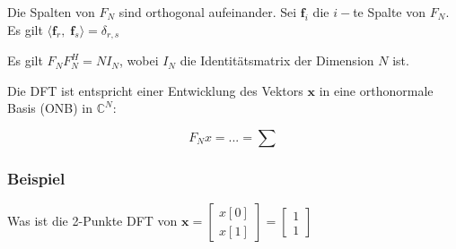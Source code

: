 \documentclass[11pt]{article}
\begin{document}

Die Spalten von $F_N$ sind orthogonal aufeinander. Sei $\mathbf{f}_i$ die $i-$te Spalte von $F_N$. Es gilt $\langle \mathbf{f}_r, \; \mathbf{f}_s \rangle = \delta_{r,s}$

Es gilt $F_N F_N^H = N I_N$, wobei $I_N$ die Identitätsmatrix der Dimension $N$ ist.

Die DFT ist entspricht einer Entwicklung des Vektors $\mathbf{x}$ in eine orthonormale Basis (ONB) in $\mathbb{C}^N$:

$$F_N x = ... = \sum$$

\vfill \null
\pagebreak

\subsubsection*{Beispiel}
\vspace*{-0.5cm}

Was ist die 2-Punkte DFT von $\mathbf{x} = \begin{bmatrix}
    x[0] \\
    x[1]
\end{bmatrix} = \begin{bmatrix}
    1 \\
    1
\end{bmatrix}$
\end{document}
